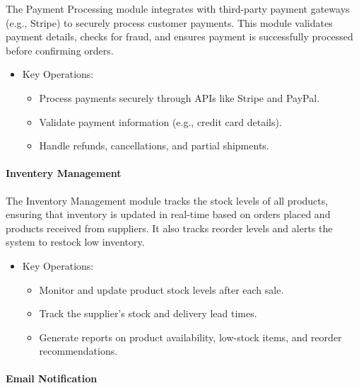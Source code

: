 \documentclass{llncs}
\begin{document}
The Payment Processing module integrates with third-party payment gateways (e.g., Stripe) to securely process customer payments. This module validates payment details, checks for fraud, and ensures payment is successfully processed before confirming orders.
\begin{itemize}
    \item Key Operations:
    \begin{itemize}
    \item Process payments securely through APIs like Stripe and PayPal.
    \item Validate payment information (e.g., credit card details).
    \item Handle refunds, cancellations, and partial shipments.
    \end{itemize}   
\end{itemize}

\paragraph{Inventery Management} \leavevmode

The Inventory Management module tracks the stock levels of all products, ensuring that inventory is updated in real-time based on orders placed and products received from suppliers. It also tracks reorder levels and alerts the system to restock low inventory.
\begin{itemize}
    \item Key Operations:
    \begin{itemize}   
        \item Monitor and update product stock levels after each sale.
        \item Track the supplier’s stock and delivery lead times.
        \item Generate reports on product availability, low-stock items, and reorder recommendations.
    \end{itemize}   
\end{itemize}
    


\paragraph{Email Notification} \leavevmode
\end{document}
